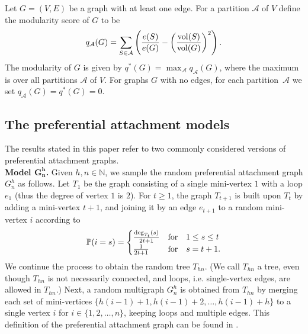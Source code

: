 \documentclass[runningheads, envcountsame, smallextended]{llncs}
\newcommand{\vol}{{\rm vol}}
\newcommand{\pr}{{\mathbb P}}
\newcommand{\q}{q^*}
\newcommand{\cA}{{\mathcal A}}
\numberwithin{theorem}{section}
\numberwithin{definition}{section}
\numberwithin{lemma}{section}
\numberwithin{corollary}{section}
\numberwithin{proposition}{section}
\numberwithin{conjecture}{section}
\numberwithin{remark}{section}
\numberwithin{equation}{section}
\begin{document}
\begin{definition} \label{def:modularity}
	Let $G=(V,E)$ be a graph with at least one edge. For a partition $\mathcal{A}$ of $V$ define the
    modularity score of $G$ to be
	\[
	q_{\mathcal{A}}(G) = \sum_{S\in\mathcal{A}}\left(\frac{e(S)}{e(G)}-\left(\frac{\vol(S)}{\vol(G)}\right)^2\right)
    .
	\]
	The modularity of $G$ is given by $\q(G) = \max_{\mathcal{A}}q_{\mathcal{A}}(G)$,
	where the maximum is over all partitions $\cA$ of $V$. For graphs $G$ with no edges, for each partition~$\cA$ we set $q_\cA(G)=\q(G)=0$.
\end{definition}


\subsection{The preferential attachment models}\label{sec:models}

The results stated in this paper refer to two commonly considered versions of preferential attachment graphs.\\

\noindent\textbf{Model $\mathbf{G_n^h}$.} Given $h,n \in \mathbb{N}$, we sample the random preferential attachment graph $G_n^h$ as follows. Let $T_1$ be the graph consisting of a single mini-vertex $1$ with a loop $e_1$ (thus the degree of vertex $1$ is $2$). For $t \geq 1$, the graph $T_{t+1}$ is built upon $T_{t}$ by adding a mini-vertex $t+1$, and joining it by an edge $e_{t+1}$ to a random mini-vertex $i$ according to
\[
\pr(i=s) = \begin{cases}  \frac{\deg_{T_t}(s)}{2t+1} & \textnormal{for} \quad 1 \leq s \leq t  \\
	\frac{1}{2t+1} & \textnormal{for} \quad s=t+1.
\end{cases}
\]
We continue the process to obtain the random tree $T_{hn}$. (We call $T_{hn}$ a tree, even though $T_{hn}$ is not necessarily connected, and loops, i.e. single-vertex edges, are allowed in $T_{hn}$.) Next, a random multigraph $G_n^h$ is obtained from $T_{hn}$ by merging each set of mini-vertices $\{h(i-1)+1, h(i-1)+2, \ldots, h(i-1)+h\}$ 
to a single vertex $i$ for $i \in \{1,2, \ldots, n\}$, keeping loops and multiple edges.
%
This definition of the preferential attachment graph can be found in \cite{Bol_Rio_chapter,Bol_Rio_diameter,Bollobas2001_deg_seq,Hofstad_2017}.\\
\end{document}
